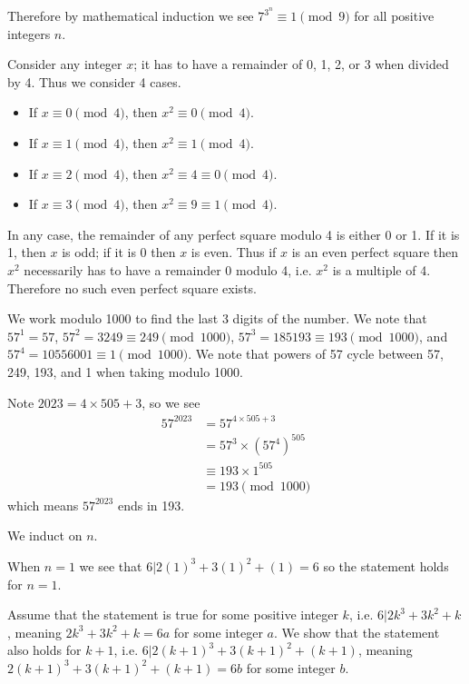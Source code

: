 \begin{questions}
    Therefore by mathematical induction we see $7^{3^n} \equiv 1 \pmod9$ for all positive integers $n$.

    \item Consider any integer $x$; it has to have a remainder of 0, 1, 2, or 3 when divided by 4. Thus we consider 4 cases.
    \begin{itemize}
        \item If $x \equiv 0 \pmod4$, then $x^2 \equiv 0 \pmod4$.
        \item If $x \equiv 1 \pmod4$, then $x^2 \equiv 1 \pmod4$.
        \item If $x \equiv 2 \pmod4$, then $x^2 \equiv 4 \equiv 0 \pmod4$.
        \item If $x \equiv 3 \pmod4$, then $x^2 \equiv 9 \equiv 1 \pmod4$.
    \end{itemize}
    In any case, the remainder of any perfect square modulo 4 is either 0 or 1. If it is 1, then $x$ is odd; if it is 0 then $x$ is even. Thus if $x$ is an even perfect square then $x^2$ necessarily has to have a remainder 0 modulo 4, i.e. $x^2$ is a multiple of 4. Therefore no such even perfect square exists.

    \item We work modulo 1000 to find the last 3 digits of the number. We note that $57^1 = 57$, $57^2 = 3249 \equiv 249 \pmod{1000}$, $57^3 = 185193 \equiv 193 \pmod{1000}$, and $57^4 = 10556001 \equiv 1 \pmod{1000}$. We note that powers of 57 cycle between 57, 249, 193, and 1 when taking modulo 1000.

    Note $2023 = 4\times505+3$, so we see
    \begin{align*}
        57^{2023} &= 57^{4\times505+3}\\
        &= 57^3 \times \left(57^4\right)^{505}\\
        &\equiv 193 \times 1^{505}\\
        &= 193 \pmod{1000}
    \end{align*}
    which means $57^{2023}$ ends in 193.

    \item \begin{partquestions}{\roman*}
        \item We induct on $n$.

        When $n = 1$ we see that $6 \vert 2(1)^3 + 3(1)^2 + (1) = 6$ so the statement holds for $n = 1$.

        Assume that the statement is true for some positive integer $k$, i.e. $6 \vert 2k^3 + 3k^2 + k$, meaning $2k^3 + 3k^2 + k = 6a$ for some integer $a$. We show that the statement also holds for $k + 1$, i.e. $6 \vert 2(k+1)^3 + 3(k+1)^2 + (k+1)$, meaning $2(k+1)^3 + 3(k+1)^2 + (k+1) = 6b$ for some integer $b$.


\end{partquestions}
\end{questions}
